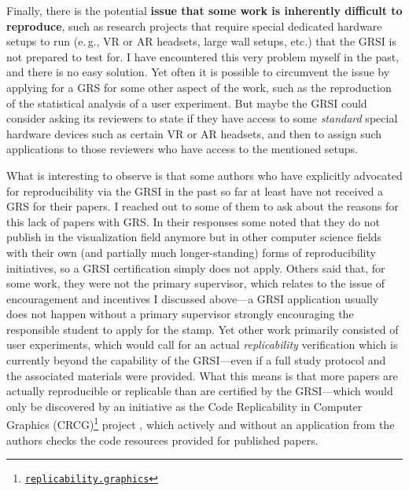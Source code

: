 \documentclass[conference,svgnames]{vgtc}                     %
\newcommand{\eg}{e.\,g.}
\begin{document}
Finally, there is the potential \textbf{issue that some work is inherently difficult to reproduce}, such as research projects that require special dedicated hardware setups to run (\eg, VR or AR headsets, large wall setups, etc.) that the GRSI is not prepared to test for. I have encountered this very problem myself in the past, and there is no easy solution. Yet often it is possible to circumvent the issue by applying for a GRS for some other aspect of the work, such as the reproduction of the statistical analysis of a user experiment. But maybe the GRSI could consider asking its reviewers to state if they have access to some \emph{standard} special hardware devices such as certain VR or AR headsets, and then to assign such applications to those reviewers who have access to the mentioned setups.

What is interesting to observe is that some authors who have explicitly advocated for reproducibility via the GRSI in the past so far at least have not received a GRS for their papers. I reached out to some of them to ask about the reasons for this lack of papers with GRS. In their responses some noted that they do not publish in the visualization field anymore but in other computer science fields with their own (and partially much lon\-ger-stan\-ding) forms of reproducibility initiatives, so a GRSI certification simply does not apply. Others said that, for some work, they were not the primary supervisor, which relates to the issue of encouragement and incentives I discussed above---a GRSI application usually does not happen without a primary supervisor strongly encouraging the responsible student to apply for the stamp. Yet other work primarily consisted of user experiments, which would call for an actual \emph{replicability} verification which is currently beyond the capability of the GRSI---even if a full study protocol and the associated materials were provided. What this means is that more papers are actually reproducible or replicable than are certified by the GRSI---which would only be discovered by an initiative as the Code Replicability in Computer Graphics (CRCG)\footnote{\href{https://replicability.graphics/}{\texttt{replicability.graphics}}} project \cite{Bonneel:2020:CRC}, which actively and without an application from the authors checks the code resources provided for published papers.
\end{document}
